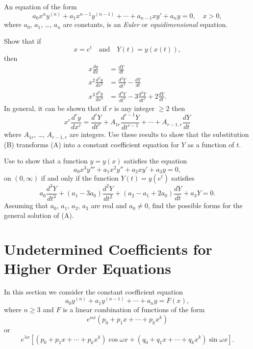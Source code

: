 \begin{exerciselist}
\item\label{exer:9.2.44}An equation of the form
\[
 a_0x^ny^{(n)}+a_1x^{n-1}y^{(n-1)}+\cdots
+a_{n-1}xy'+a_ny=0,\quad x>0,
\tag{A}
\]
where $a_0$, $a_1$, \dots, $a_n$ are constants, is an \emph{\color{blue}Euler} or
\emph{\color{blue}equidimensional} equation.

Show that if
\[
 x=e^t \quad \text{and} \quad Y(t)=y(x(t)),
\tag{B}
\]
then
\begin{align*}
x \frac{dy}{dx}&=\frac{dY}{dt}\\
x^2\frac{d^2y}{dx^2}&=\frac{d^2Y}{dt^2}-\frac{dY}{dt}\\
x^3\frac{d^3y}{dx^3}&=\frac{d^3Y}{dt^3}-3\frac{d^2Y}{dt^2}+2\frac{dY}{dt}.
\end{align*}
In general, it can be shown that if $r$ is any integer $\ge2$ then
\[
x^r \frac{d^ry}{dx^r}=\frac{d^rY}{dt^r}+
 A_{1r}\frac{d^{r-1}Y}{dt^{r-1}}+\cdots+A_{r-1,r}
 \frac{dY}{dt}
\]
where $A_{1r}$, \dots, $A_{r-1,r}$ are integers.  Use these results to
show that the substitution (B) transforms (A) into a
constant coefficient equation for $Y$ as a function of $t$.


\item\label{exer:9.2.45}Use   to show that a function $y=y(x)$ satisfies
the equation
\[
 a_0x^3y'''+a_1x^2y''+a_2xy'+a_3y=0,
\tag{A}
\]
on $(0,\infty)$
if and only if the function $Y(t)=y(e^t)$ satisfies
\[
a_0\frac{d^3Y}{dt^3}+(a_1-3a_0) \frac{d^2Y}{dt^2}+(a_2-a_1+2a_0)
\frac{dY}{dt}+a_3Y=0.
\]
Assuming that $a_0$, $a_1$, $a_2$, $a_3$ are real and $a_0 \ne0$, find
the possible forms for the general solution of (A).
\end{exerciselist}



\section{Undetermined Coefficients for Higher Order  Equations}
\label{sec:higher_undetermined}

In this section we consider the constant coefficient equation
\begin{equation}
 \label{eq:9.3.1} a_0y^{(n)}+a_1y^{(n-1)}+\cdots+a_ny=F(x),
\end{equation}
where $n\ge3$ and $F$ is a linear combination of
functions of the form
\[
e^{\alpha x}\left(p_0+p_1x+\cdots+p_kx^k\right)
\]
or
\[
e^{\lambda x}\left[\left(p_0+p_1x+\cdots+p_kx^k\right)
\cos\omega x+
\left(q_0+q_1x+\cdots+q_kx^k\right)
\sin\omega x\right].
\]

